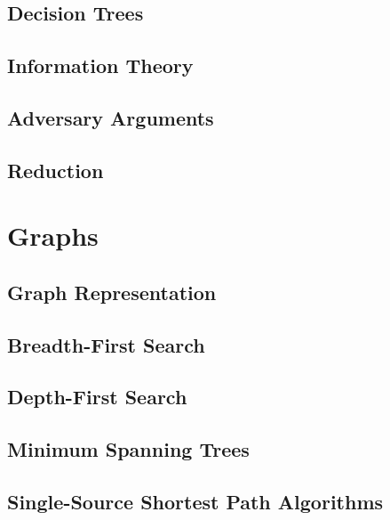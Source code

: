 \documentclass[11pt,fleqn,dvipsnames]{book} %
\begin{document}
\chapter{Decision Trees}


\chapter{Information Theory}


\chapter{Adversary Arguments}


\chapter{Reduction}


\part{Graphs}

\chapter{Graph Representation}


\chapter{Breadth-First Search}


\chapter{Depth-First Search}


\chapter{Minimum Spanning Trees}


\chapter{Single-Source Shortest Path Algorithms}






\end{document}

